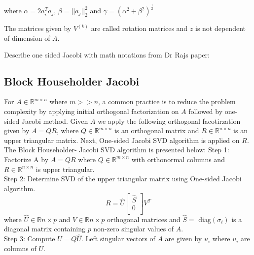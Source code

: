 \documentclass[10pt, conference, compsocconf]{IEEEtran}
\begin{document}
where $\alpha = 2a_i^Ta_j$, $\beta = ||a_j||^2_2$ and $\gamma = (\alpha^2 + \beta^2)^{\frac{1}{2}}$

The matrices given by $V^{(k)}$ are called rotation matrices and $z$ is not dependent of dimension of $A$.

Describe one sided Jacobi with math notations from Dr Rajs paper:
\subsection{Block Householder Jacobi}
For $A \in \mathbb{R}^{m \times n}$ where $m >> n$, a common practice is to reduce the problem complexity by applying initial orthogonal factorization on $A$ followed by one-sided Jacobi method. Given $A$ we apply the following orthogonal facotirzation given by $A = QR$, where $Q \in \mathbb{R}^{m \times n}$ is an orthogonal matrix and $R \in \mathbb{R}^{n \times n}$ is an upper triangular matrix. Next, One-sided Jacobi SVD algorithm is applied on $R$. The Block Householder- Jacobi SVD algorithm is presented below:
Step 1: Factorize A by $A = QR$ where $Q \in \mathbb{R}^{m \times n}$ with orthonormal columns and $R \in \mathbb{R}^{n \times n}$ is upper triangular. \\
Step 2: Determine SVD of the upper triangular matrix using One-sided Jacobi algorithm.
\begin{equation}
R = \hat{U}\left[ \begin{array}{c}
\hat{S} \\
\text{0}\\
\end{array} \right]
V^T
\end{equation}
where $\hat{U} \in \mathbb{R}{n \times p}$ and $V \in \mathbb{R}{n \times p}$ orthogonal matrices and $\hat{S} =$ diag$(\sigma_i)$ is a diagonal matrix containing $p$ non-zero singular values of $A$. \\
Step 3: Compute $U = Q\hat{U}$. Left singular vectors of $A$ are given by $u_i$ where $u_i$ are columns of $U$. 
\end{document}
